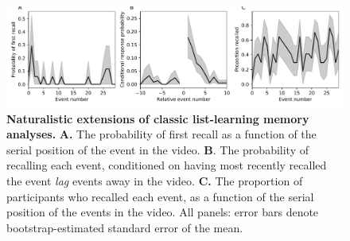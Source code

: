 \documentclass{article}
\begin{document}




\begin{figure}[tp]
  \centering
  \includegraphics[width=1\textwidth]{figs/list_learning}
  \caption{\small \textbf{Naturalistic extensions of classic list-learning memory analyses.} \textbf{A.} The probability of first recall as a function of the serial position of the event in the video. \textbf{B}.  The probability of recalling each event, conditioned on having most recently recalled the event \textit{lag} events away in the video.  \textbf{C.} The proportion of participants who recalled each event, as a function of the serial position of the events in the video.  All panels: error bars denote bootstrap-estimated standard error of the mean.}
  \label{fig:list-learning}
\end{figure}
\end{document}
